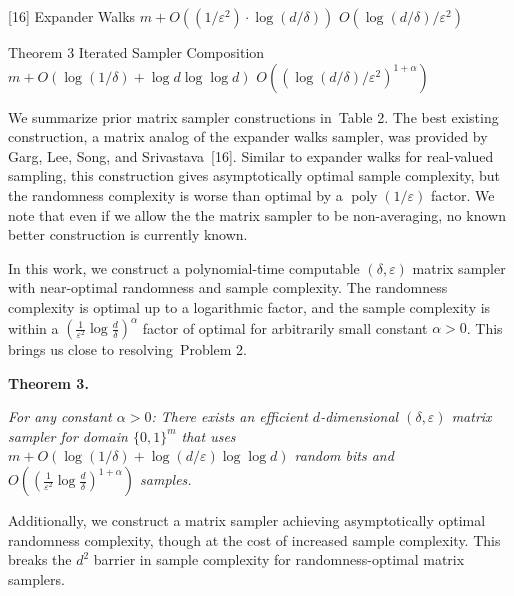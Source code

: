 \documentclass[10pt,a4paper]{article}
\begin{document}
[16] 
Expander Walks 
$m+O((1/\varepsilon^{2})\cdot\log(d/\delta))$ 
$O(\log(d/\delta)/\varepsilon^{2})$ 
\par


Theorem 3 
Iterated Sampler Composition 
$m+O(\log(1/\delta)+\log d\log\log d)$ 
$O((\log(d/\delta)/\varepsilon^{2})^{1+\alpha})$ 
\par







We summarize prior matrix sampler constructions in Table 2.
The best existing construction, a matrix analog of the expander walks sampler, was provided by Garg, Lee, Song, and Srivastava [16].
Similar to expander walks for real-valued sampling, this construction gives asymptotically optimal sample complexity, but the randomness complexity is worse than optimal by a $\operatorname*{poly}(1/\varepsilon)$ factor. We note that even if we allow the the matrix sampler to be non-averaging, no known better construction is currently known.\par




In this work, we construct a polynomial-time computable $(\delta,\varepsilon)$ matrix sampler with near-optimal randomness and sample complexity. The randomness complexity is optimal up to a logarithmic factor, and the sample complexity is within a $(\frac{1}{\varepsilon^{2}}\log\frac{d}{\delta})^{\alpha}$ factor of optimal for arbitrarily small constant $\alpha>0$. This brings us close to resolving Problem 2.\par





\par\medskip\noindent\textbf{
\textbf{Theorem 3}\textbf{.}
}\par



\emph{For any constant $\alpha>0$:
There exists an efficient $d$-dimensional $(\delta,\varepsilon)$ matrix sampler for domain $\{0,1\}^{m}$ that uses $m+O(\log(1/\delta)+\log(d/\varepsilon)\log\log d)$ random bits and $O((\frac{1}{\varepsilon^{2}}\log\frac{d}{\delta})^{1+\alpha})$ samples.}\par






Additionally, we construct a matrix sampler achieving asymptotically optimal randomness complexity, though at the cost of increased sample complexity. This breaks the $d^{2}$ barrier in sample complexity for randomness-optimal matrix samplers.\par
\end{document}
